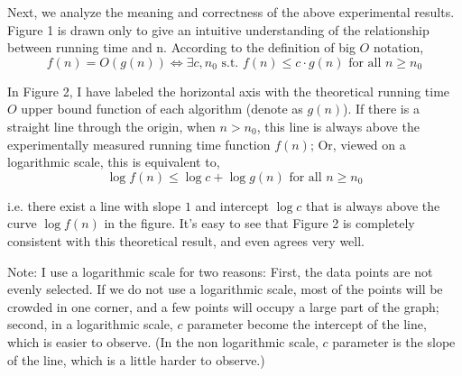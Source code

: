 \documentclass[11pt]{article}
\theoremstyle{plain}
\begin{document}
Next, we analyze the meaning and correctness of the above experimental results. Figure 1 is 
drawn only to give an intuitive understanding of the relationship between running time and n. 
According to the definition of big $O$ notation, 
\[
  f(n) = O(g(n)) \iff \exists c, n_0 \text{ s.t. } f(n) \leq c \cdot g(n) \text{ for all } n \geq n_0
\]

In Figure 2, I have labeled the horizontal axis with the theoretical running time $O$ upper bound 
function of each algorithm (denote as $g(n)$). If there is a straight line through the origin, 
when $n>n_0$, this line is always above the experimentally measured running time function $f(n)$; 
Or, viewed on a logarithmic scale, this is equivalent to,
\[
  \log f(n) \leq \log c + \log g(n) \text{ for all } n \geq n_0
\]

i.e. there exist a line with slope $1$ and intercept $\log c$ that is always above the curve $\log f(n)$ in the figure.
It's easy to see that Figure 2 is completely consistent with this theoretical result, and even agrees very well.

Note: I use a logarithmic scale for two reasons: First, the data points are not evenly selected. If we do not use 
a logarithmic scale, most of the points will be crowded in one corner, and a few points will occupy a large part of 
the graph; second, in a logarithmic scale, $c$ parameter become the intercept of the line, which is easier to observe.
(In the non logarithmic scale, $c$ parameter is the slope of the line, which is a little harder to observe.)

\nocite{*}
\end{document}
